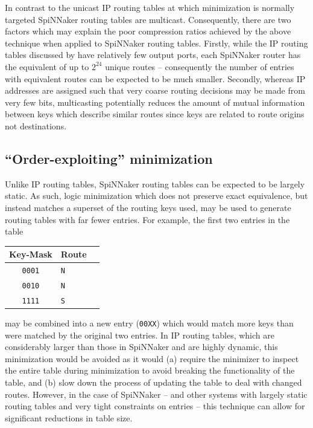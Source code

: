 \documentclass[conference]{IEEEtran}
\newcommand{\mytt}[1]{\texttt{\footnotesize#1}}
\begin{document}
In contrast to the unicast IP routing tables at which minimization is normally targeted SpiNNaker routing tables are multicast.
Consequently, there are two factors which may explain the poor compression ratios achieved by the above technique when applied to SpiNNaker routing tables.
Firstly, while the IP routing tables discussed by \textcite{Liu2002} have relatively few output ports, each SpiNNaker router has the equivalent of up to $2^{24}$ unique routes -- consequently the number of entries with equivalent routes can be expected to be much smaller.
Secondly, whereas IP addresses are assigned such that very coarse routing decisions may be made from very few bits, multicasting potentially reduces the amount of mutual information between keys which describe similar routes since keys are related to route origins not destinations.

\subsection*{``Order-exploiting'' minimization}

Unlike IP routing tables, SpiNNaker routing tables can be expected to be largely static.
As such, logic minimization which does not preserve exact equivalence, but instead matches a superset of the routing keys used, may be used to generate routing tables with far fewer entries.
For example, the first two entries in the table

  \begin{table}[H]
    \centering
    \begin{tabular}{c l l}
      \toprule
      Key-Mask & Route \\
      \midrule
      \texttt{0001} & \texttt{N} \\
      \texttt{0010} & \texttt{N} \\
      \texttt{1111} & \texttt{S} \\
      \bottomrule
    \end{tabular}
  \end{table}

\noindent may be combined into a new entry (\mytt{00XX}) which would match more keys than were matched by the original two entries.
In IP routing tables, which are considerably larger than those in SpiNNaker and are highly dynamic, this minimization would be avoided as it would (a) require the minimizer to inspect the entire table during minimization to avoid breaking the functionality of the table,
and (b) slow down the process of updating the table to deal with changed routes.
However, in the case of SpiNNaker -- and other systems with largely static routing tables and very tight constraints on entries -- this technique can allow for significant reductions in table size.
\end{document}
